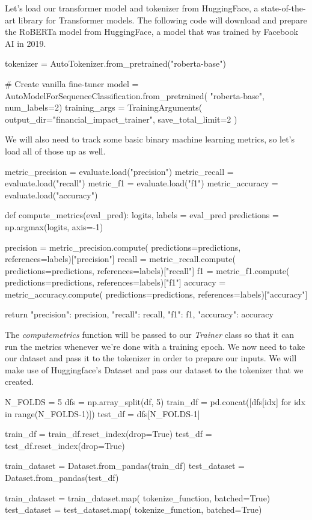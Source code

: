 Let's load our transformer model and tokenizer from HuggingFace\cite{wolf2020huggingfaces}, a state-of-the-art library for Transformer models.
The following code will download and prepare the RoBERTa\cite{liu2019roberta} model from HuggingFace, a model that was trained by Facebook AI in 2019.

\begin{python}
tokenizer = AutoTokenizer.from_pretrained("roberta-base")

# Create vanilla fine-tuner
model = AutoModelForSequenceClassification.from_pretrained(
    "roberta-base", num_labels=2)
training_args = TrainingArguments(
    output_dir="financial_impact_trainer",
    save_total_limit=2
)
\end{python}

We will also need to track some basic binary machine learning metrics, so let's load all of those up as well.

\begin{python}
metric_precision = evaluate.load("precision")
metric_recall = evaluate.load("recall")
metric_f1 = evaluate.load("f1")
metric_accuracy = evaluate.load("accuracy")

def compute_metrics(eval_pred):
    logits, labels = eval_pred
    predictions = np.argmax(logits, axis=-1)

    precision = metric_precision.compute(
        predictions=predictions,
        references=labels)["precision"]
    recall = metric_recall.compute(
        predictions=predictions,
        references=labels)["recall"]
    f1 = metric_f1.compute(
        predictions=predictions,
        references=labels)["f1"]
    accuracy = metric_accuracy.compute(
        predictions=predictions,
        references=labels)["accuracy"]

    return {
        "precision": precision,
        "recall": recall,
        "f1": f1,
        "accuracy": accuracy
    }
\end{python}

The \textit{compute\textunderscore metrics} function will be passed to our \textit{Trainer} class so that it can run the metrics whenever we're done with a training epoch. We now need to take our dataset and pass it to the tokenizer in order to prepare our inputs. We will make use of Huggingface's Dataset and pass our dataset to the tokenizer that we created.

\begin{python}
N_FOLDS = 5
dfs = np.array_split(df, 5)
train_df = pd.concat([dfs[idx] for idx in range(N_FOLDS-1)])
test_df = dfs[N_FOLDS-1]

train_df = train_df.reset_index(drop=True)
test_df = test_df.reset_index(drop=True)

train_dataset = Dataset.from_pandas(train_df)
test_dataset = Dataset.from_pandas(test_df)

train_dataset = train_dataset.map(
    tokenize_function, batched=True)
test_dataset = test_dataset.map(
    tokenize_function, batched=True)
\end{python}

